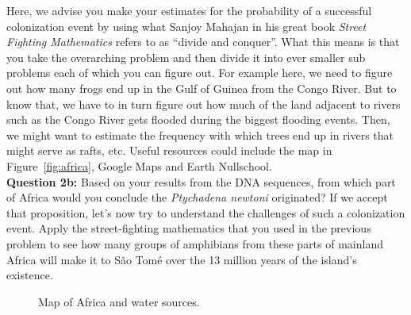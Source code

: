 Here, we advise you make your estimates for the probability of a successful
colonization event by using what Sanjoy Mahajan in his great book {\it Street
Fighting Mathematics} refers to as ``divide and conquer''.  What this means is
that you take the overarching problem and then divide it into ever smaller sub
problems each of which you can figure out.  For example here, we need to figure
out how many frogs end up in the Gulf of Guinea from the Congo River.  But to
know that, we have to in turn figure out how much of the land adjacent to rivers
such as the Congo River gets flooded during the biggest flooding events. Then,
we might want to estimate the frequency with which trees end up in rivers that
might serve as rafts, etc. Useful resources could include the map in
Figure~\ref{fig:africa},  Google Maps and Earth Nullschool.\\

\textbf{Question 2b:} Based on your results from the DNA sequences, from which
part of Africa would you conclude the \emph{Ptychadena newtoni} originated? If
we accept that proposition, let's now try to understand the challenges of such a
colonization event. Apply the street-fighting mathematics that you used in the
previous problem to see how many groups of amphibians from these parts of
mainland Africa will make it to S\~ao Tom\'e over the 13 million years of the
island's existence.


\begin{figure}[h!]
	\caption{Map of Africa and water sources.}
	\label{fig:africa_water}
\end{figure}
